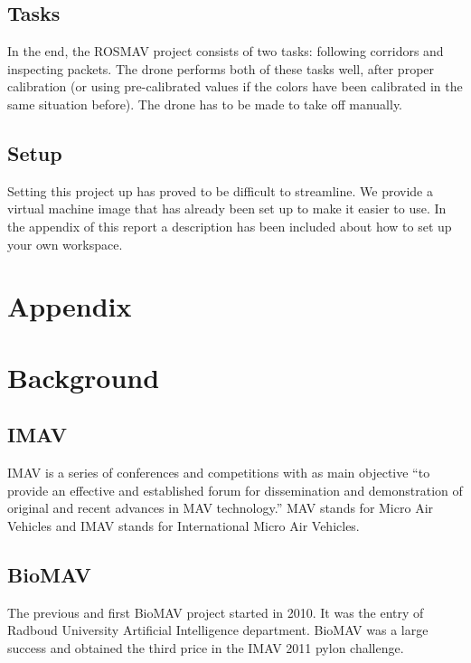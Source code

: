 \documentclass[a4paper,10pt]{article}
\begin{document}
\subsection{Tasks}
In the end, the ROSMAV project consists of two tasks: following corridors and
inspecting packets. The drone performs both of these tasks well, after proper
calibration (or using pre-calibrated values if the colors have been calibrated
in the same situation before). The drone has to be made to take off manually.
\subsection{Setup}
Setting this project up has proved to be difficult to streamline. We provide
a virtual machine image that has already been set up to make it easier to use.
In the appendix of this report a description has been included about how to set up your own workspace. 



\section*{Appendix}
\section{Background}
\label{sec:background}
\subsection{IMAV}
IMAV is a series of conferences and competitions with as main objective
``to provide an effective and established forum for dissemination and
demonstration of original and recent advances in MAV technology.''\cite{imav}
MAV stands for Micro Air Vehicles and IMAV stands for International
Micro Air Vehicles.

\subsection{BioMAV}
The previous and first BioMAV project started in 2010. It was the entry
of Radboud University Artificial Intelligence department. BioMAV was a large
success and obtained the third price in the IMAV 2011 pylon challenge.
\end{document}

